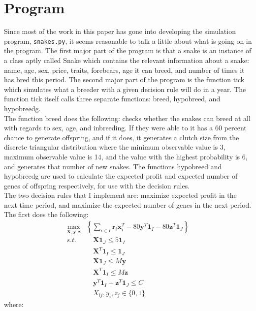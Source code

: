 \documentclass{article}
\begin{document}
	\section*{Program}
	\indent\indent Since most of the work in this paper has gone into developing the simulation program, \texttt{snakes.py}, it seems reasonable to talk a little about what is going on in the program. The first major part of the program is that a snake is an instance of a class aptly called Snake which contains the relevant information about a snake: name, age, sex, price, traits, forebears, age it can breed, and number of times it has bred this period. The second major part of the program is the function tick which simulates what a breeder with a given decision rule will do in a year. The function tick itself calls three separate functions: breed, hypobreed, and hypobreedg.\\\indent The function breed does the following: checks whether the snakes can breed at all with regards to sex, age, and inbreeding. If they were able to it has a 60 percent chance to generate offspring, and if it does, it generates a clutch size from the discrete triangular distribution where the minimum observable value is 3, maximum observable value is 14, and the value with the highest probability is 6, and generates that number of new snakes. The functions hypobreed and hypobreedg are used to calculate the expected profit and expected number of genes of offspring respectively, for use with the decision rules.\\
	\indent The two decision rules that I implement are: maximize expected profit in the next time period, and maximize the expected number of genes in the next period. The first does the following:
	\begin{align*}
		\max_{\mathbf{X},\mathbf{y},\mathbf{z}}&\left\{ \sum_{i\in I}\mathbf r_i \mathbf x_i^T - 80\mathbf y^T\mathbf 1_I - 80\mathbf z^T\mathbf 1_J \right\}\\
      s.t. & \quad\mathbf X\mathbf 1_J \leq 5\mathbf 1_I \\
      &\quad \mathbf X^T \mathbf 1_I \leq \mathbf1_J\\
      &\quad \mathbf X \mathbf1_J\leq M\mathbf y\\
      & \quad\mathbf X^T\mathbf 1_I \leq M\mathbf z\\
      &\quad \mathbf y^T\mathbf 1_I + \mathbf z^T\mathbf 1_J \leq C\\
      & \quad X_{ij}, y_i, z_j \in \{0,1\}
	\end{align*}
	where:
\end{document}
